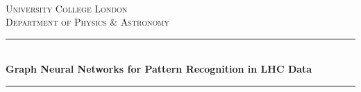 \documentclass[12pt, a4paper, oneside]{book}
\begin{document}
\begin{titlepage}


\newcommand{\HRule}{\rule{\linewidth}{0.5mm}} %
\center %



\textsc{}\\[2.0cm]
\textsc{\LARGE University College London}\\[0.5cm] %
\textsc{\Large Department of Physics \& Astronomy}\\[1.0cm] %



\HRule \\[0.65cm]
{ \huge \bfseries Graph Neural Networks for Pattern Recognition in LHC Data}\\[0.4cm] %
\HRule \\[1.5cm]
 
 

{}




\end{titlepage}
\end{document}
